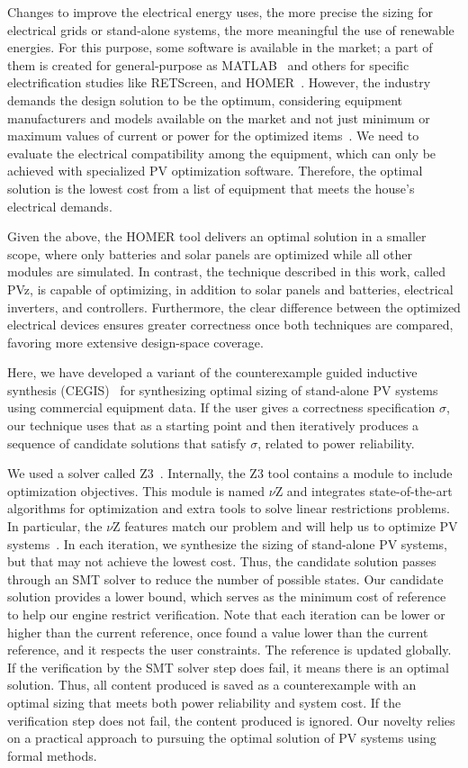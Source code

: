 \documentclass[journal]{IEEEtran}
\begin{document}
Changes to improve the electrical energy uses, the more precise the sizing for electrical grids or stand-alone systems, the more meaningful the use of renewable energies. For this purpose, some software is available in the market; a part of them is created for general-purpose as MATLAB~\cite{Benatiallah2017} and others for specific electrification studies like RETScreen, and HOMER~\cite{Pradhan,Swarnkar}. However, the industry demands the design solution to be the optimum, considering equipment manufacturers and models available on the market and not just minimum or maximum values of current or power for the optimized items~\cite{DBLP:journals/corr/abs-1909-13139, Applasamy2011}. We need to evaluate the electrical compatibility among the equipment, which can only be achieved with specialized PV optimization software. Therefore, the optimal solution is the lowest cost from a list of equipment that meets the house's electrical demands.

Given the above, the HOMER tool delivers an optimal solution in a smaller scope, where only batteries and solar panels are optimized while all other modules are simulated. In contrast, the technique described in this work, called PVz, is capable of optimizing, in addition to solar panels and batteries, electrical inverters, and controllers. Furthermore, the clear difference between the optimized electrical devices ensures greater correctness once both techniques are compared, favoring more extensive design-space coverage.

Here, we have developed a variant of the counterexample guided inductive synthesis (CEGIS)~\cite{AbateCAV2018} for synthesizing optimal sizing of stand-alone PV systems using commercial equipment data. If the user gives a correctness specification $\sigma$, our technique uses that as a starting point and then iteratively produces a sequence of candidate solutions that satisfy $\sigma$, related to power reliability.
 
We used a solver called Z3~\cite{BjornerPF15}. Internally, the Z3 tool contains a module to include optimization objectives. This module is named $\nu$Z and integrates state-of-the-art algorithms for optimization and extra tools to solve linear restrictions problems. In particular, the $\nu$Z features match our problem and will help us to optimize PV systems~\cite{BjornerPF15}. In each iteration, we synthesize the sizing of stand-alone PV systems, but that may not achieve the lowest cost. Thus, the candidate solution passes through an SMT solver to reduce the number of possible states. Our candidate solution provides a lower bound, which serves as the minimum cost of reference to help our engine restrict verification. Note that each iteration can be lower or higher than the current reference, once found a value lower than the current reference, and it respects the user constraints. The reference is updated globally. If the verification by the SMT solver step does fail, it means there is an optimal solution. Thus, all content produced is saved as a counterexample with an optimal sizing that meets both power reliability and system cost. If the verification step does not fail, the content produced is ignored. Our novelty relies on a practical approach to pursuing the optimal solution of PV systems using formal methods. 
\end{document}
